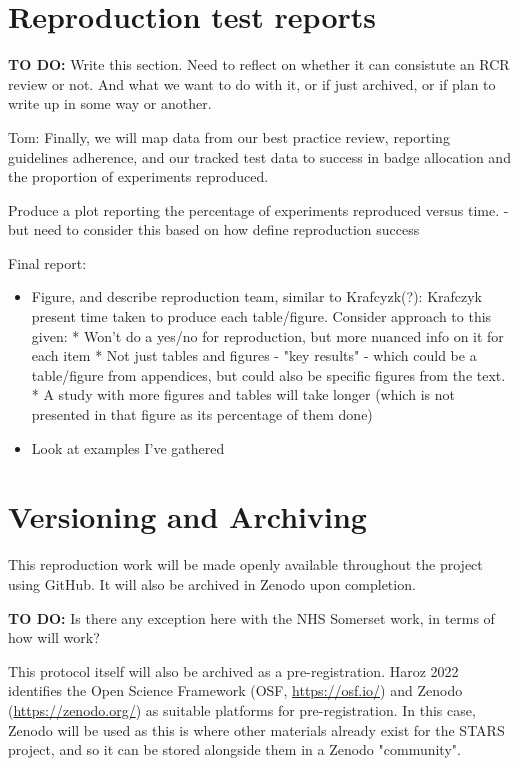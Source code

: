 \section{Reproduction test reports}


\textbf{TO DO:} Write this section. Need to reflect on whether it can consistute an RCR review or not. And what we want to do with it, or if just archived, or if plan to write up in some way or another.

Tom: Finally, we will map data from our best practice review, reporting guidelines adherence, and our tracked test data to success in badge allocation and the proportion of experiments reproduced.

Produce a plot reporting the percentage of experiments reproduced versus time. - but need to consider this based on how define reproduction success

Final report:
\begin{itemize}
    \item Figure, and describe reproduction team, similar to Krafcyzk(?):\autocite{krafczyk_learning_2021} Krafczyk present time taken to produce each table/figure. Consider approach to this given: * Won't do a yes/no for reproduction, but more nuanced info on it for each item * Not just tables and figures - "key results" - which could be a table/figure from appendices, but could also be specific figures from the text. * A study with more figures and tables will take longer (which is not presented in that figure as its percentage of them done)
    \item Look at examples I've gathered
\end{itemize}

\section{Versioning and Archiving}

This reproduction work will be made openly available throughout the project using GitHub. It will also be archived in Zenodo upon completion.

\textbf{TO DO:} Is there any exception here with the NHS Somerset work, in terms of how will work?

This protocol itself will also be archived as a pre-registration. Haroz 2022 identifies the Open Science Framework (OSF, \url{https://osf.io/}) and Zenodo (\url{https://zenodo.org/}) as suitable platforms for pre-registration.\autocite{haroz_comparison_2022} In this case, Zenodo will be used as this is where other materials already exist for the STARS project, and so it can be stored alongside them in a Zenodo "community".

